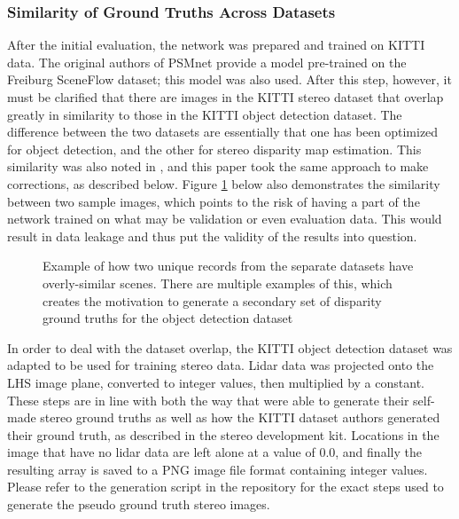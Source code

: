 \subsubsection{Similarity of Ground Truths Across Datasets}
After the initial evaluation, the network was prepared and trained on KITTI data. The original authors of PSMnet provide a model pre-trained on the Freiburg SceneFlow dataset; this model was also used. After this step, however, it must be clarified that there are images in the KITTI stereo dataset that overlap greatly in similarity to those in the KITTI object detection dataset. The difference between the two datasets are essentially that one has been optimized for object detection, and the other for stereo disparity map estimation. This similarity was also noted in \cite{wang_pseudo-lidar_2019}, and this paper took the same approach to make corrections, as described below. Figure \ref{similarity_stereo_objdet} below also demonstrates the similarity between two sample images, which points to the risk of having a part of the network trained on what may be validation or even evaluation data. This would result in data leakage and thus put the validity of the results into question.

\begin{figure}[ht]
	\centering
	\caption{Example of how two unique records from the separate datasets have overly-similar scenes. There are multiple examples of this, which creates the motivation to generate a secondary set of disparity ground truths for the object detection dataset}
	\label{similarity_stereo_objdet}
\end{figure}

In order to deal with the dataset overlap, the KITTI object detection dataset was adapted to be used for training stereo data. Lidar data was projected onto the LHS image plane, converted to integer values, then multiplied by a constant. These steps are in line with both the way that \cite{wang_pseudo-lidar_2019} were able to generate their self-made stereo ground truths as well as how the KITTI dataset authors generated their ground truth, as described in the stereo development kit. Locations in the image that have no lidar data are left alone at a value of 0.0, and finally the resulting array is saved to a PNG image file format containing integer values. Please refer to the generation script in the repository for the exact steps used to generate the pseudo ground truth stereo images.

